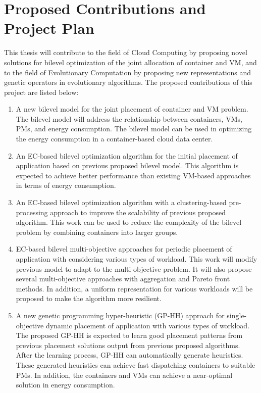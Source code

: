 \chapter{Proposed Contributions and Project Plan}\label{C:con}

This thesis will contribute to the field of Cloud Computing by proposing novel solutions for bilevel optimization of the joint allocation of container and VM, and to the field of Evolutionary Computation by proposing new representations and genetic operators in evolutionary algorithms. The proposed contributions of this project are listed below:
 
\begin{enumerate}
	\item A new bilevel model for the joint placement of container and VM problem.  The bilevel model will address the relationship between containers, VMs, PMs, and energy consumption. The bilevel model can be used in optimizing the energy consumption in a container-based cloud data center.
	\item An EC-based bilevel optimization algorithm for the initial placement of application based on previous proposed bilevel model. This algorithm is expected to achieve better performance than existing VM-based approaches in terms of energy consumption. 
	\item An EC-based bilevel optimization algorithm with a clustering-based pre-processing approach to improve the scalability of previous proposed algorithm. This work can be used to reduce the complexity of the bilevel problem by combining containers into larger groups.
	\item EC-based bilevel multi-objective approaches for periodic placement of application with considering various types of workload.
	This work will modify previous model to adapt to the multi-objective problem. It will also propose several multi-objective approaches with aggregation and Pareto front methods. In addition, a uniform representation for various workloads will be proposed to make the algorithm more resilient.
	\item A new genetic programming hyper-heuristic (GP-HH) approach for single-objective dynamic placement of application with various types of workload. The proposed GP-HH is expected to learn good placement patterns from previous placement solutions output from previous proposed algorithms. After the learning process, GP-HH can automatically generate heuristics. These generated heuristics can achieve fast dispatching containers to suitable PMs. In addition, the containers and VMs can achieve a near-optimal solution in energy consumption.
\end{enumerate}

